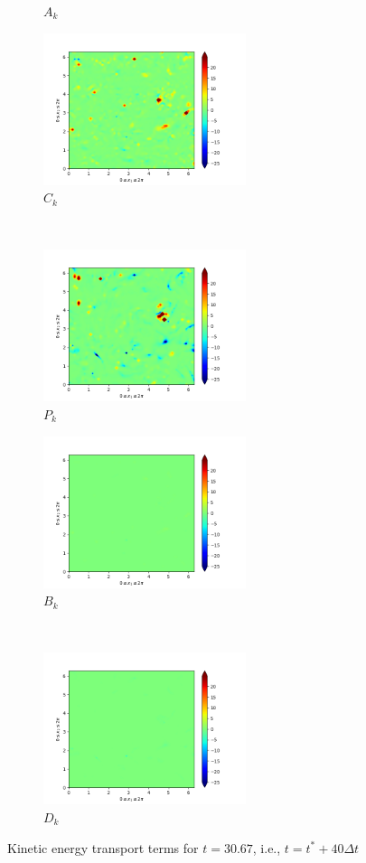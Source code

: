 \begin{figure}[H]
\begin{subfigure}{0.45\textwidth}
        \caption{$A_{k}$}
    \end{subfigure}
    \newline
    \begin{subfigure}{0.45\textwidth}
        \includegraphics[height=1.75in]{media/run-cds-65/C-ke-1380.png}
        \caption{$C_{k}$}
    \end{subfigure}
    ~
    \begin{subfigure}{0.45\textwidth}
        \includegraphics[height=1.75in]{media/run-cds-65/P-ke-1380.png}
        \caption{$P_{k}$}
    \end{subfigure}
    \newline
    \begin{subfigure}{0.45\textwidth}
        \includegraphics[height=1.75in]{media/run-cds-65/B-ke-1380.png}
        \caption{$B_{k}$}
    \end{subfigure}
    ~
    \begin{subfigure}{0.45\textwidth}
        \includegraphics[height=1.75in]{media/run-cds-65/D-ke-1380.png}
        \caption{$D_{k}$}
    \end{subfigure}
    \caption{Kinetic energy transport terms for $t=30.67$, i.e., $t=t^{\ast} + 40 \Delta t$}
\end{figure}
